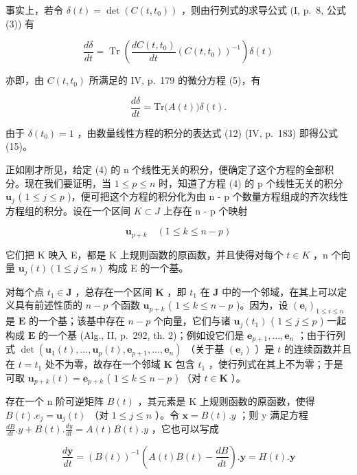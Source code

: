 事实上，若令 \(\delta(t) = \det\left(C(t, t_0)\right)\) ，则由行列式的求导公式 (I, p.~8, 公式 (3)) 有

\[
\frac {d \delta}{d t} = \operatorname{Tr} \left(\frac {d C (t , t _ {0})}{d t} \left(C (t, t _ {0})\right) ^ {- 1}\right) \delta (t)
\]

亦即，由 \(C(t, t_0)\) 所满足的 IV, p.~179 的微分方程 (5)，有

\[
\frac {d \delta}{d t} = \mathrm{Tr} \big (A (t) \big) \delta (t).
\]

由于 \(\delta(t_0) = 1\) ，由数量线性方程的积分的表达式 (12) (IV, p.~183) 即得公式 (15)。

正如刚才所见，给定 (4) 的 n 个线性无关的积分，便确定了这个方程的全部积分。现在我们要证明，当 \(1 \leqslant p \leqslant n\) 时，知道了方程 (4) 的 p 个线性无关的积分 \(\mathbf{u}_{j}\) ( \(1 \leqslant j \leqslant p\) )，便可把这个方程的积分化为由 n - p 个数量方程组成的齐次线性方程组的积分。设在一个区间 \(K \subset J\) 上存在 n - p 个映射

\[
\mathbf {u} _ {p + k} \quad (1 \leqslant k \leqslant n - p)
\]

它们把 K 映入 E，都是 K 上规则函数的原函数，并且使得对每个 \(t \in K\) ，n 个向量 \(\mathbf{u}_{j}(t) (1 \leqslant j \leqslant n)\) 构成 E 的一个基。

对每个点 \(t_1 \in \mathbf{J}\) ，总存在一个区间 \(\mathbf{K}\) ，即 \(t_1\) 在 \(\mathbf{J}\) 中的一个邻域，在其上可以定义具有前述性质的 \(n - p\) 个函数 \(\mathbf{u}_{p+k}\) ( \(1 \leqslant k \leqslant n - p\) )。因为，设 \((\mathbf{e}_i)_{1 \leqslant i \leqslant n}\) 是 \(\mathbf{E}\) 的一个基；该基中存在 \(n - p\) 个向量，它们与诸 \(\mathbf{u}_j(t_1)\) ( \(1 \leqslant j \leqslant p\) ) 一起构成 \(\mathbf{E}\) 的一个基 (Alg., II, p.~292, th. 2)；例如设它们是 \(\mathbf{e}_{p+1}, \ldots, \mathbf{e}_n\) ；由于行列式 \(\det(\mathbf{u}_1(t), \ldots, \mathbf{u}_p(t), \mathbf{e}_{p+1}, \ldots, \mathbf{e}_n)\) （关于基 \((\mathbf{e}_i)\) ）是 \(t\) 的连续函数并且在 \(t = t_1\) 处不为零，故存在一个邻域 \(\mathbf{K}\) 包含 \(t_1\) ，使行列式在其上不为零；于是可取 \(\mathbf{u}_{p+k}(t) = \mathbf{e}_{p+k}\) ( \(1 \leqslant k \leqslant n - p\) ) （对 \(t \in \mathbf{K}\) ）。

存在一个 n 阶可逆矩阵 \(B(t)\) ，其元素是 K 上规则函数的原函数，使得 \(B(t).e_{j} = \mathbf{u}_{j}(t)\) （对 \(1 \leqslant j \leqslant n\) ）。令 \(\mathbf{x} = B(t).y\) ；则 y 满足方程 \(\frac{dB}{dt}.y + B(t).\frac{dy}{dt} = A(t)B(t).y\) ，它也可以写成

\[
\frac {d \mathbf {y}}{d t} = (B (t)) ^ {- 1} \left(A (t) B (t) - \frac {d B}{d t}\right). \mathbf {y} = H (t). \mathbf {y}
\]

